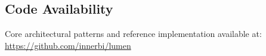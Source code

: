 \documentclass[11pt,a4paper]{article}
\theoremstyle{definition}
\theoremstyle{remark}
\begin{document}
\subsection{Code Availability}

Core architectural patterns and reference implementation available at:
\url{https://github.com/innerbi/lumen}




\end{document}
